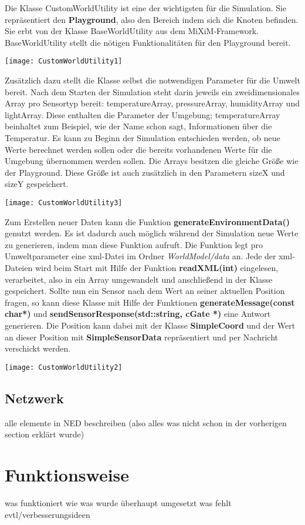 Die Klasse CustomWorldUtility ist eine der wichtigsten für die Simulation. Sie repräsentiert den \textbf{Playground}, also den Bereich indem sich die Knoten befinden. Sie erbt von der Klasse BaseWorldUtility aus dem MiXiM-Framework. BaseWorldUtility stellt die nötigen Funktionalitäten für den Playground bereit. \newline

\begin{center}
\texttt{[image: CustomWorldUtility1]}
\end{center}

Zusätzlich dazu stellt die Klasse selbst die notwendigen Parameter für die Umwelt bereit. Nach dem Starten der Simulation steht darin jeweils ein zweidimensionales Array pro Sensortyp bereit: temperatureArray, pressureArray, humidityArray und lightArray. Diese enthalten die Parameter der Umgebung; temperatureArray beinhaltet zum Beispiel, wie der Name schon sagt, Informationen über die Temperatur. \newline
Es kann zu Beginn der Simulation entschieden werden, ob neue Werte berechnet werden sollen oder die bereits vorhandenen Werte für die Umgebung übernommen werden sollen. Die Arrays besitzen die gleiche Größe wie der Playground. Diese Größe ist auch zusätzlich in den Parametern sizeX und sizeY gespeichert.

\begin{center}
\texttt{[image: CustomWorldUtility3]}
\end{center}

Zum Erstellen neuer Daten kann die Funktion \textbf{generateEnvironmentData()} genutzt werden. Es ist dadurch auch möglich während der Simulation neue Werte zu generieren, indem man diese Funktion aufruft. Die Funktion legt pro Umweltparameter eine xml-Datei im Ordner \textit{WorldModel/data} an. Jede der xml-Dateien wird beim Start mit Hilfe der Funktion \textbf{readXML(int)} eingelesen, verarbeitet, also in ein Array umgewandelt und anschließend in der Klasse gespeichert. \newline
Sollte nun ein Sensor nach dem Wert an seiner aktuellen Position fragen, so kann diese Klasse mit Hilfe der Funktionen \textbf{generateMessage(const char*)} und \textbf{sendSensorResponse(std::string, cGate *)} eine Antwort generieren. Die Position kann dabei mit der Klasse \textbf{SimpleCoord} und der Wert an dieser Position mit \textbf{SimpleSensorData} repräsentiert und per Nachricht verschickt werden.

\begin{center}
\texttt{[image: CustomWorldUtility2]}
\end{center}

\subsection{Netzwerk}

alle elemente in NED beschreiben (also alles was nicht schon in der vorherigen section erklärt wurde)

\section{Funktionsweise}

was funktioniert wie
was wurde überhaupt umgesetzt
was fehlt evtl/verbesserungsideen